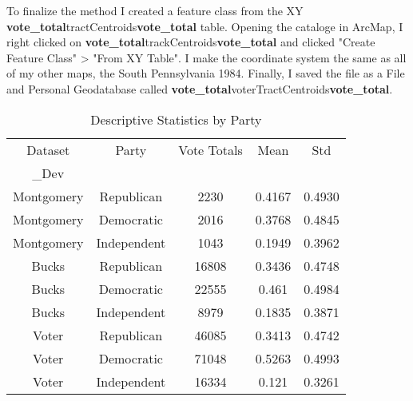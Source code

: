 \documentclass[12pt]{article}
\begin{document}
To finalize the method I created a feature class from the XY \textbf{vote\_total}tractCentroids\textbf{vote\_total} table.  Opening the cataloge in ArcMap, I right clicked on \textbf{vote\_total}trackCentroids\textbf{vote\_total} and clicked "Create Feature Class" > "From XY Table".  I make the coordinate system the same as all of my other maps, the South Pennsylvania 1984.  Finally, I saved the file as a File and Personal Geodatabase called \textbf{vote\_total}voterTractCentroids\textbf{vote\_total}.


\begin{table}[]
\centering
\caption{Descriptive Statistics by Party}
\label{my-label}
\begin{tabular}{ccccc}
Dataset    & Party       & Vote Totals & Mean   & Std\\\_Dev \\ \hline
Montgomery & Republican  & 2230         & 0.4167 & 0.4930    \\
Montgomery & Democratic  & 2016         & 0.3768 & 0.4845   \\
Montgomery & Independent & 1043         & 0.1949 & 0.3962   \\ \hline
Bucks      & Republican  & 16808        & 0.3436 & 0.4748   \\
Bucks      & Democratic  & 22555        & 0.461  & 0.4984   \\
Bucks      & Independent & 8979         & 0.1835 & 0.3871   \\ \hline
Voter      & Republican  & 46085        & 0.3413 & 0.4742   \\
Voter      & Democratic  & 71048        & 0.5263 & 0.4993   \\
Voter      & Independent & 16334        & 0.121  & 0.3261  \\ \hline \hline
\end{tabular}
\end{table}
\end{document}
